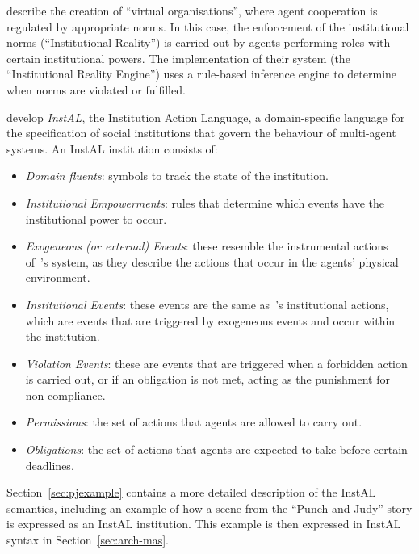 \documentclass[11pt]{report}
\begin{document}
\citet{cardoso2007institutional} describe the creation of ``virtual
organisations'', where agent cooperation is regulated by appropriate norms. In
this case, the enforcement of the institutional norms (``Institutional
Reality'') is carried out by agents
performing roles with certain institutional powers. The implementation of their
system (the ``Institutional Reality Engine'') uses a rule-based inference engine
to determine when norms are violated or fulfilled.

\citet{cliffe2007specifying} develop \emph{InstAL}, the Institution Action
Language, a domain-specific language for the specification of social
institutions that govern the behaviour of multi-agent systems. An InstAL
institution consists of:

\begin{itemize}
\item \emph{Domain fluents}: symbols to track the state of the institution.
\item \emph{Institutional Empowerments}: rules that determine which events have
  the institutional power to occur.
\item \emph{Exogeneous (or external) Events}: these resemble the instrumental actions
  of~\citet{fornara2007agent}'s system, as they describe the actions that occur
  in the agents' physical environment.
\item \emph{Institutional Events}: these events are the same
  as~\citet{fornara2007agent}'s institutional actions, which are events that are
  triggered by exogeneous events and occur within the institution.
\item \emph{Violation Events}: these are events that are triggered when a
  forbidden action is carried out, or if an obligation is not met, acting as the
  punishment for non-compliance.
\item \emph{Permissions}: the set of actions that agents are allowed to carry out.
\item \emph{Obligations}: the set of actions that agents are expected to take
  before certain deadlines.
\end{itemize}

Section~\ref{sec:pjexample} contains a more detailed description of the InstAL
semantics, including an example of how a scene from the ``Punch and Judy''
story is expressed as an InstAL institution. This example is then expressed in
InstAL syntax in Section~\ref{sec:arch-mas}.
\end{document}
